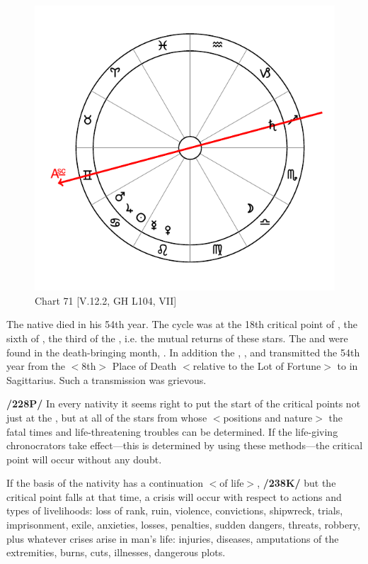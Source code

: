 \begin{figure}
\centering
\vspace{-20pt}
\includegraphics[width=.68\textwidth]{charts/5_12_2}
\caption{Chart 71 [V.12.2, GH L104, VII]}
\label{fig:chart71}
\end{figure}

The native died in his 54th year. The cycle was at the 18th critical point of \Saturn, the sixth of \Jupiter, the third of the \Sun, i.e. the mutual returns of these stars. The \Sun\xspace and \Jupiter\xspace
were found in the death-bringing month, \Sagittarius. In addition the \Sun, \Jupiter, and \Mars\xspace transmitted the 54th year from the $<$8th$>$ Place of Death $<$relative to the Lot of Fortune$>$ to \Saturn\xspace in Sagittarius. Such a transmission was grievous.

\textbf{/228P/} In every nativity it seems right to put the start of the critical points not just at the \Moon, but at all of the stars from whose $<$positions and nature$>$ the fatal times and life-threatening troubles can be determined. If the life-giving chronocrators take effect—this is determined by using these methods—the critical point will occur without any doubt. 

If the basis of the nativity has a continuation $<$of life$>$, \textbf{/238K/} but the critical point falls at that time, a crisis will occur with respect to actions and types of livelihoods: loss of rank, ruin, violence, convictions, shipwreck, trials, imprisonment, exile, anxieties, losses,
penalties, sudden dangers, threats, robbery, plus whatever crises arise in man’s life: injuries, diseases, amputations of the extremities, burns, cuts, illnesses, dangerous plots. 

